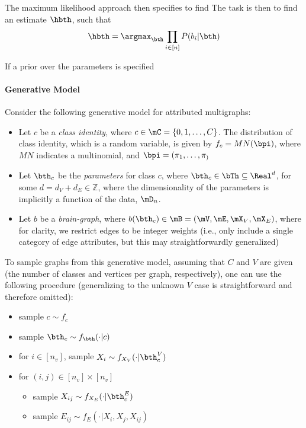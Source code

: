 The maximum likelihood approach then specifies to find The task is then to find an estimate $\hbth$, such that
\begin{align}
	\hbth = \argmax_{\bth} \prod_{i\in [n]} P(b_i | \bth) 
\end{align}

If a prior over the parameters is specified

\paragraph{Generative Model}

Consider the following generative model for attributed multigraphs:
\begin{itemize}
	\item Let $c$ be a \emph{class identity}, where $c \in \mC=\{0,1,\ldots, C\}$. The distribution of class identity, which is a random variable, is given by $f_c=MN(\bpi)$, where $MN$ indicates a multinomial, and $\bpi=(\pi_1, \ldots, \pi_)$ 
	\item Let $\bth_c$ be the \emph{parameters} for class $c$, where $\bth_c \in \bTh \subseteq \Real^{d}$, for some $d=d_{V}+d_{E} \in \mathbb{Z}$, where the dimensionality of the parameters is implicitly a function of the data, $\mD_n$. 
	\item Let $b$ be a \emph{brain-graph}, where $b(\bth_c) \in \mB=(\mV, \mE, \mX_V, \mX_E)$, where for clarity, we restrict edges to be integer weights (i.e., only include a single category of edge attributes, but this may straightforwardly generalized)	%
\end{itemize}

To sample graphs from this generative model, assuming that $C$ and $V$ are given (the number of classes and vertices per graph, respectively), one can use the following procedure (generalizing to the unknown $V$ case is straightforward and therefore omitted):
\begin{itemize}
	\item sample $c \sim f_c$ 
	\item sample $\bth_c \sim f_{\bth}(\cdot | c)$ 
	\item for $i \in [n_v]$, sample $X_i \sim f_{X_V}(\cdot | \bth_c^V)$ 
	\item for $(i,j) \in [n_v] \times [n_v]$ 
	\begin{itemize}
		\item sample $X_{ij} \sim f_{X_E}(\cdot | \bth_c^E)$ 
		\item sample $E_{ij} \sim f_E(\cdot | X_i, X_j, X_{ij})$ 
	\end{itemize}
\end{itemize}

